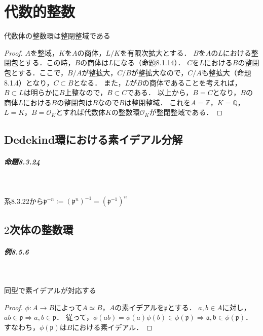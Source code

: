 \setcounter{chapter}{7}
\chapter{代数的整数}
\begin{screen}
  \begin{thm} \label{B_normal_ring}
    代数体の整数環は整閉整域である
  \end{thm}
\end{screen}
\begin{proof}
  $A$を整域，$K$を$A$の商体，$L/K$を有限次拡大とする．
  $B$を$A$の$L$における整閉包とする．この時，$B$の商体は$L$になる（命題8.1.14）．
  $C$を$L$における$B$の整閉包とする．ここで，$B/A$が整拡大，$C/B$が整拡大なので，$C/A$も整拡大（命題8.1.4）となり，$C \subset B$となる．
  また，$L$が$B$の商体であることを考えれば，$B \subset L$は明らかに$B$上整なので，$B \subset C$である．
  以上から，$B = C$となり，$B$の商体$L$における$B$の整閉包は$B$なので$B$は整閉整域．
  これを$A = \mathbb{Z}$，$K = \mathbb{Q}$，$L = K$，$B = \mathcal{O}_K$とすれば代数体$K$の整数環$ \mathcal{O}_K$が整閉整域である．
\end{proof}

\setcounter{section}{2}
\section{Dedekind環における素イデアル分解}
\paragraph{命題8.3.24}~
\begin{screen}
  系8.3.22から\(\mathfrak{p}^{-n} := (\mathfrak{p}^n)^{-1} = (\mathfrak{p}^{-1})^n\)
\end{screen}

\setcounter{section}{4}
\section{$2$次体の整数環}
\paragraph{例8.5.6}~
\begin{screen}
  同型で素イデアルが対応する
\end{screen}
\begin{proof}
  $ \phi:A \to B$によって$A \simeq B$，$A$の素イデアルを$ \mathfrak{p}$とする．
  $a, b \in A$に対し，$ab \in \mathfrak{p} \Rightarrow a, b \in \mathfrak{p}$．
  従って，$ \phi(ab) = \phi(a) \phi(b) \in \phi( \mathfrak{p}) \Rightarrow \mathfrak{a}, \mathfrak{b} \in \phi( \mathfrak{p})$．
  すなわち，$ \phi( \mathfrak{p})$は$B$における素イデアル．
\end{proof}

